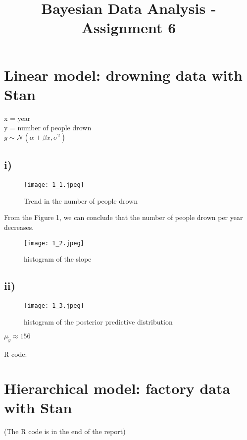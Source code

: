 \documentclass[article,11pt]{article}
\title{\huge Bayesian Data Analysis - Assignment 6}
\begin{document}
 \maketitle
 \section{Linear model: drowning data with Stan}
 x = year \\
 y = number of people drown \\
 $y \sim \mathcal{N}(\alpha+\beta x, \sigma^{2})$
 \subsection*{i)}
 \begin{figure}[H]
 	\centering
 	\captionsetup{justification=centering}
 	\texttt{[image: 1\_1.jpeg]}
 	\caption{Trend in the number of people drown}
 \end{figure}
From the Figure 1, we can conclude that the number of people drown per year decreases.
\begin{figure}[H]
	\centering
	\captionsetup{justification=centering}
	\texttt{[image: 1\_2.jpeg]}
	\caption{histogram of the slope}
\end{figure}

\subsection*{ii)}
\begin{figure}[H]
	\centering
	\captionsetup{justification=centering}
	\texttt{[image: 1\_3.jpeg]}
	\caption{histogram of the posterior predictive distribution}
\end{figure}
\begin{center}
	$\mu_{\tilde{y}}\approx 156$
\end{center}


R code:



\section{Hierarchical model: factory data with Stan}
(The R code is in the end of the report)
\end{document}
